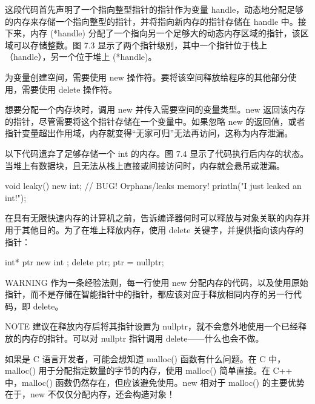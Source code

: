 这段代码首先声明了一个指向整型指针的指针作为变量 handle，动态地分配足够的内存来存储一个指向整型的指针，并将指向新内存的指针存储在 handle 中。接下来，内存 (*handle) 分配了一个指向另一个足够大的动态内存区域的指针，该区域可以存储整数。图 7.3 显示了两个指针级别，其中一个指针位于栈上（handle），另一个位于堆上 (*handle)。



为变量创建空间，需要使用 new 操作符。要将该空间释放给程序的其他部分使用，需要使用 delete 操作符。


想要分配一个内存块时，调用 new 并传入需要空间的变量类型。new 返回该内存的指针，尽管需要将这个指针存储在一个变量中。如果忽略 new 的返回值，或者指针变量超出作用域，内存就变得“无家可归”无法再访问，这称为内存泄漏。

以下代码遗弃了足够存储一个 int 的内存。图 7.4 显示了代码执行后内存的状态。当堆上有数据块，且无法从栈上直接或间接访问时，内存就会悬吊或泄漏。


\begin{cpp}
void leaky()
{
    new int; // BUG! Orphans/leaks memory!
    println("I just leaked an int!");
}
\end{cpp}

在具有无限快速内存的计算机之前，告诉编译器何时可以释放与对象关联的内存并用于其他目的。为了在堆上释放内存，使用 delete 关键字，并提供指向该内存的指针：

\begin{cpp}
int* ptr { new int };
delete ptr;
ptr = nullptr;
\end{cpp}

\begin{myWarning}{WARNING}
作为一条经验法则，每一行使用 new 分配内存的代码，以及使用原始指针，而不是存储在智能指针中的指针，都应该对应于释放相同内存的另一行代码，即 delete。
\end{myWarning}

\begin{myNotic}{NOTE}
建议在释放内存后将其指针设置为 nullptr，就不会意外地使用一个已经释放的内存的指针。可以对 nullptr 指针调用 delete——什么也会不做。
\end{myNotic}


如果是 C 语言开发者，可能会想知道 malloc() 函数有什么问题。在 C 中，malloc() 用于分配指定数量的字节的内存，使用 malloc() 简单直接。在 C++ 中，malloc() 函数仍然存在，但应该避免使用。new 相对于 malloc() 的主要优势在于，new 不仅仅分配内存，还会构造对象！

